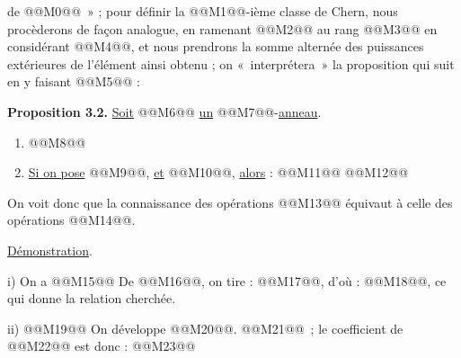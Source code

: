 
de @@M0@@~» ;
pour définir la @@M1@@-ième classe de Chern, nous procèderons de façon analogue, en ramenant @@M2@@ au rang @@M3@@ en considérant @@M4@@, et nous prendrons la somme alternée des puissances extérieures de l'élément ainsi obtenu ; on «~interprétera~» la proposition qui suit en y faisant @@M5@@ :

\textbf{Proposition 3.2.} \uline{Soit} @@M6@@ \uline{un} @@M7@@-\uline{anneau}.
\begin{enumerate}[label=\roman*)]
\item @@M8@@
\item \uline{Si on pose} @@M9@@, \uline{et} @@M10@@, \uline{alors} :
@@M11@@
@@M12@@
\end{enumerate}

On voit donc que la connaissance des opérations @@M13@@ équivaut à celle des opérations @@M14@@.

\uline{Démonstration}.

i) On a
@@M15@@
De @@M16@@, on tire : @@M17@@, d'où : @@M18@@, ce qui donne la relation cherchée.

ii) @@M19@@
On développe @@M20@@. @@M21@@~; le coefficient de @@M22@@ est donc :
@@M23@@

